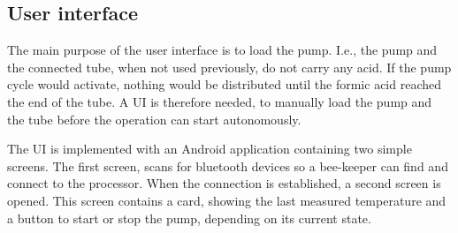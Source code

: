 \subsection{User interface}\label{subsec:user-interface}

The main purpose of the user interface is to load the pump.
I.e., the pump and the connected tube, when not used previously, do not carry any acid.
If the pump cycle would activate, nothing would be distributed until the formic acid reached the end of the tube.
A UI is therefore needed, to manually load the pump and the tube before the operation can start autonomously.

The UI is implemented with an Android application containing two simple screens.
The first screen, scans for bluetooth devices so a bee-keeper can find and connect to the processor.
When the connection is established, a second screen is opened.
This screen contains a card, showing the last measured temperature and a button to start or stop the pump, depending on its current state.

